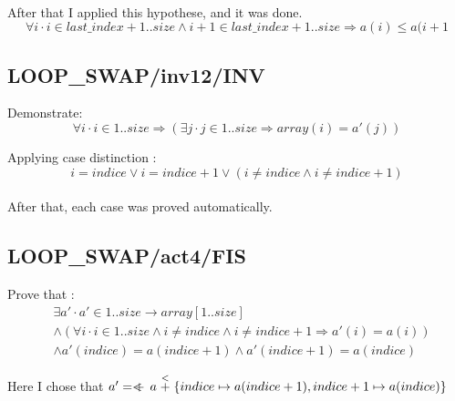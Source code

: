 \paragraph{}
After that I applied this hypothese, and it was done.
$$
\forall i \cdot i \in last\_index+1..size \land i+1 \in last\_index+1..size \Rightarrow a(i) \leq a(i+1
$$

\subsection{LOOP\_SWAP/inv12/INV}
Demonstrate:
$$
\forall i \cdot i \in 1..size \Rightarrow (\exists j \cdot j \in 1..size \Rightarrow array(i)=a'(j))
$$

Applying case distinction : 
$$
i=indice \lor i=indice+1 \lor (i \neq indice \land i \neq indice+1)
$$
\paragraph{}
After that, each case was proved automatically.

\subsection{LOOP\_SWAP/act4/FIS}
Prove that :
\begin{align*}
&\exists a' \cdot a' \in 1..size \to array[1..size] \\ 
&\land (\forall i \cdot i \in 1..size \land i \neq indice \land i \neq indice+1 \Rightarrow a'(i)=a(i)) \\ 
&\land a'(indice) = a(indice+1) \land a'(indice+1) = a(indice)
\end{align*}

Here I chose that $ a' = \qeq a \stackrel{<}{+} \{indice \mapsto a(indice+1), indice+1 \mapsto a(indice) \} $





